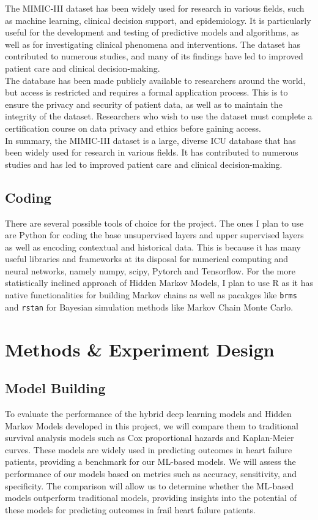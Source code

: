 \documentclass[%
 reprint,
 amsmath,amssymb,
 aps,
 nofootinbib
]{revtex4-2}
\theoremstyle{definition}
\begin{document}
The MIMIC-III dataset has been widely used for research in various fields, such as machine learning, clinical decision support, and epidemiology. It is particularly useful for the development and testing of predictive models and algorithms, as well as for investigating clinical phenomena and interventions. The dataset has contributed to numerous studies, and many of its findings have led to improved patient care and clinical decision-making.\\

The database has been made publicly available to researchers around the world, but access is restricted and requires a formal application process. This is to ensure the privacy and security of patient data, as well as to maintain the integrity of the dataset. Researchers who wish to use the dataset must complete a certification course on data privacy and ethics before gaining access.\\

In summary, the MIMIC-III dataset is a large, diverse ICU database that has been widely used for research in various fields. It has contributed to numerous studies and has led to improved patient care and clinical decision-making.

\subsection{\label{coding}Coding}

There are several possible tools of choice for the project. The ones I plan to use are Python for coding the base unsupervised layers and upper supervised layers as well as encoding contextual and historical data. This is because it has many useful libraries and frameworks at its disposal for numerical computing and neural networks, namely numpy, scipy, Pytorch and Tensorflow. For the more statistically inclined approach of Hidden Markov Models, I plan to use R as it has native functionalities for building Markov chains as well as pacakges like \texttt{brms} and \texttt{rstan} for Bayesian simulation methods like Markov Chain Monte Carlo.

\section{\label{methods}Methods \& Experiment Design}

\subsection{\label{build}Model Building}
To evaluate the performance of the hybrid deep learning models and Hidden Markov Models developed in this project, we will compare them to traditional survival analysis models such as Cox proportional hazards and Kaplan-Meier curves. These models are widely used in predicting outcomes in heart failure patients, providing a benchmark for our ML-based models. We will assess the performance of our models based on metrics such as accuracy, sensitivity, and specificity. The comparison will allow us to determine whether the ML-based models outperform traditional models, providing insights into the potential of these models for predicting outcomes in frail heart failure patients.
\end{document}
